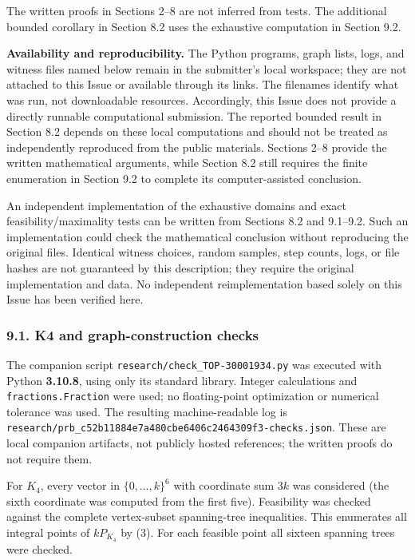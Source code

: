 \documentclass{article}
\begin{document}
The written proofs in Sections 2--8 are not inferred from tests. The additional bounded corollary in Section 8.2 uses the exhaustive computation in Section 9.2.

\textbf{Availability and reproducibility.} The Python programs, graph lists, logs, and witness files named below remain in the submitter's local workspace; they are not attached to this Issue or available through its links. The filenames identify what was run, not downloadable resources. Accordingly, this Issue does not provide a directly runnable computational submission. The reported bounded result in Section 8.2 depends on these local computations and should not be treated as independently reproduced from the public materials. Sections 2--8 provide the written mathematical arguments, while Section 8.2 still requires the finite enumeration in Section 9.2 to complete its computer-assisted conclusion.

An independent implementation of the exhaustive domains and exact feasibility/maximality tests can be written from Sections 8.2 and 9.1--9.2. Such an implementation could check the mathematical conclusion without reproducing the original files. Identical witness choices, random samples, step counts, logs, or file hashes are not guaranteed by this description; they require the original implementation and data. No independent reimplementation based solely on this Issue has been verified here.

\subsubsection{9.1. K4 and graph-construction checks}

The companion script \texttt{research/check\_TOP-30001934.py} was executed with Python \textbf{3.10.8}, using only its standard library. Integer calculations and \texttt{fractions.Fraction} were used; no floating-point optimization or numerical tolerance was used. The resulting machine-readable log is \texttt{research/prb_c52b11884e7a480cbe6406c2464309f3-checks.json}. These are local companion artifacts, not publicly hosted references; the written proofs do not require them.

For \(K_4\), every vector in \(\{0,\ldots,k\}^6\) with coordinate sum \(3k\) was considered (the sixth coordinate was computed from the first five). Feasibility was checked against the complete vertex-subset spanning-tree inequalities. This enumerates all integral points of \(kP_{K_4}\) by (3). For each feasible point all sixteen spanning trees were checked.
\end{document}

